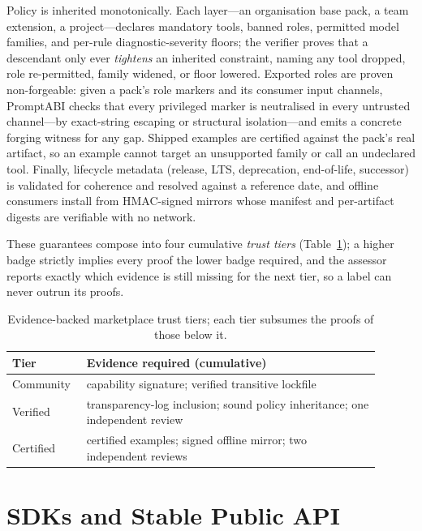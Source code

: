\documentclass[10pt]{article}
\begin{document}
Policy is inherited monotonically. Each layer---an organisation base pack, a
team extension, a project---declares mandatory tools, banned roles, permitted
model families, and per-rule diagnostic-severity floors; the verifier proves that
a descendant only ever \emph{tightens} an inherited constraint, naming any tool
dropped, role re-permitted, family widened, or floor lowered. Exported roles are
proven non-forgeable: given a pack's role markers and its consumer input
channels, PromptABI checks that every privileged marker is neutralised in every
untrusted channel---by exact-string escaping or structural isolation---and emits a
concrete forging witness for any gap. Shipped examples are certified against the
pack's real artifact, so an example cannot target an unsupported family or call an
undeclared tool. Finally, lifecycle metadata (release, LTS, deprecation,
end-of-life, successor) is validated for coherence and resolved against a
reference date, and offline consumers install from HMAC-signed mirrors whose
manifest and per-artifact digests are verifiable with no network.

These guarantees compose into four cumulative \emph{trust tiers}
(Table~\ref{tab:trust-tiers}); a higher badge strictly implies every proof the
lower badge required, and the assessor reports exactly which evidence is still
missing for the next tier, so a label can never outrun its proofs.

\begin{table}[h]
\centering
\small
\begin{tabular}{p{0.16\linewidth}p{0.74\linewidth}}
\toprule
Tier & Evidence required (cumulative) \\
\midrule
Community & capability signature; verified transitive lockfile \\
Verified & transparency-log inclusion; sound policy inheritance; one
independent review \\
Certified & certified examples; signed offline mirror; two independent
reviews \\
\bottomrule
\end{tabular}
\caption{Evidence-backed marketplace trust tiers; each tier subsumes the proofs
of those below it.}
\label{tab:trust-tiers}
\end{table}

\newpage
\section{SDKs and Stable Public API}
\end{document}
